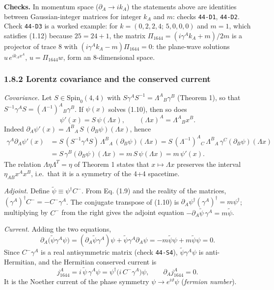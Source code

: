 \documentclass[
  10pt,
]{article}
\begin{document}
\textbf{Checks.} In momentum space (\(\partial_A\to ik_A\)) the
statements above are identities between Gaussian-integer matrices for
integer \(k_A\) and \(m\): checks \texttt{44-D1}, \texttt{44-D2}. Check
\texttt{44-D3} is a worked example: for \(k=(0,2,2,4;\,5,0,0,0)\) and
\(m=1\), which satisfies (1.12) because \(25=24+1\), the matrix
\(\Pi_{1644}=(i\gamma^Ak_A+m)/2m\) is a projector of trace 8 with
\((i\gamma^Ak_A-m)\Pi_{1644}=0\): the plane-wave solutions
\(u\,e^{ik_Ax^A}\), \(u=\Pi_{1644}w\), form an 8-dimensional space.

\hypertarget{lorentz-covariance-and-the-conserved-current}{%
\subsubsection{1.8.2 Lorentz covariance and the conserved
current}\label{lorentz-covariance-and-the-conserved-current}}

\emph{Covariance.} Let \(S\in\mathrm{Spin}_0(4,4)\) with
\(S\gamma^AS^{-1}=\Lambda^A{}_B\gamma^B\) (Theorem 1), so that
\(S^{-1}\gamma^AS=(\Lambda^{-1})^A{}_B\gamma^B\). If \(\psi(x)\) solves
(1.10), then so does
\[\psi'(x)=S\,\psi(\Lambda x),\qquad(\Lambda x)^A=\Lambda^A{}_Bx^B .\]
Indeed
\(\partial_A\psi'(x)=\Lambda^B{}_A\,S\,(\partial_B\psi)(\Lambda x)\),
hence
\[\begin{aligned}\gamma^A\partial_A\psi'(x)&=S\,(S^{-1}\gamma^AS)\,\Lambda^B{}_A\,(\partial_B\psi)(\Lambda x)
=S\,(\Lambda^{-1})^A{}_C\,\Lambda^B{}_A\,\gamma^C(\partial_B\psi)(\Lambda x)\\
&=S\,\gamma^B(\partial_B\psi)(\Lambda x)=m\,S\,\psi(\Lambda x)=m\,\psi'(x).\end{aligned}\]
The relation \(\Lambda\eta\Lambda^T=\eta\) of Theorem 1 states that
\(x\mapsto\Lambda x\) preserves the interval \(\eta_{AB}x^Ax^B\),
i.e.~that it is a symmetry of the 4+4 spacetime.

\emph{Adjoint.} Define \(\tilde\psi\equiv\psi^\dagger C^{-}\). From Eq.
(1.9) and the reality of the matrices,
\((\gamma^A)^\dagger C^{-}=-C^{-}\gamma^A\). The conjugate transpose of
(1.10) is \(\partial_A\psi^\dagger(\gamma^A)^\dagger=m\psi^\dagger\);
multiplying by \(C^{-}\) from the right gives the adjoint equation
\(-\partial_A\tilde\psi\,\gamma^A=m\tilde\psi\).

\emph{Current.} Adding the two equations,
\[\partial_A\big(\tilde\psi\gamma^A\psi\big)=(\partial_A\tilde\psi\gamma^A)\psi+\tilde\psi\gamma^A\partial_A\psi=-m\tilde\psi\psi+m\tilde\psi\psi=0 .\]
Since \(C^{-}\gamma^A\) is a real antisymmetric matrix (check
\texttt{44-S4}), \(\tilde\psi\gamma^A\psi\) is anti-Hermitian, and the
Hermitian conserved current is
\[j_{1644}^A=i\,\tilde\psi\,\gamma^A\psi=\psi^\dagger\big(i\,C^{-}\gamma^A\big)\psi,\qquad\partial_Aj_{1644}^A=0 .\tag{1.13}\]
It is the Noether current of the phase symmetry
\(\psi\to e^{i\vartheta}\psi\) (\emph{fermion number}).
\end{document}
